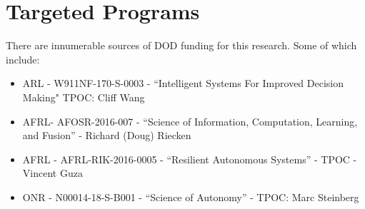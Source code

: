 \documentclass[12pt]{article}
\begin{document}













\vspace{-5mm}
\section{Targeted Programs} There are innumerable sources of DOD funding for this research. Some of which include: 

\begin{itemize}[noitemsep]

\item ARL - W911NF-170-S-0003 - ``Intelligent Systems For Improved Decision Making" TPOC: Cliff Wang


\item AFRL- AFOSR-2016-007 - ``Science of Information, Computation, Learning, and Fusion'' -  Richard (Doug) Riecken


\item AFRL - AFRL-RIK-2016-0005 - ``Resilient Autonomous Systems'' -  TPOC - Vincent Guza

\item ONR - N00014-18-S-B001 - ``Science of Autonomy'' - TPOC: Marc Steinberg 


\end{itemize}









\end{document}
